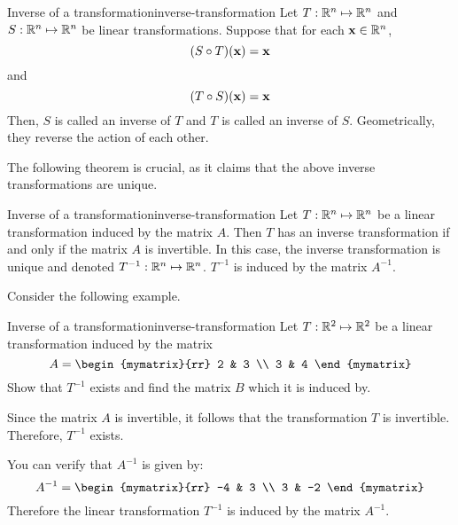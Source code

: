 \begin{definition}{Inverse of a transformation}{inverse-transformation}
Let $T: \mathbb{R}^n \mapsto \mathbb{R}^n$ and $S:\mathbb{R}^n \mapsto \mathbb{R}^n$ be linear transformations. Suppose that for each $\mbox{\bf x} \in \mathbb{R}^n$, 
\[
(S \circ T)(\mbox{\bf x}) = \mbox{\bf x}
\]
and 
\[
(T \circ S)(\mbox{\bf x}) = \mbox{\bf x}
\]
Then, $S$ is called an inverse of $T$  and $T$ is called an inverse of $S$. Geometrically, they reverse the action of each other. 
\end{definition}

The following theorem is crucial, as it claims that the above inverse transformations are unique. 

\begin{theorem}{Inverse of a transformation}{inverse-transformation}
Let $T:\mathbb{R}^n \mapsto \mathbb{R}^n$ be a linear transformation induced by the matrix $A$. Then $T$ has an inverse transformation if and only if the matrix $A$ is invertible. In this case, the inverse transformation is unique and denoted $T^{-1}: \mathbb{R}^n \mapsto \mathbb{R}^n$. $T^{-1}$ is induced by the matrix $A^{-1}$. 
\end{theorem}

Consider the following example. 

\begin{example}{Inverse of a transformation}{inverse-transformation}
Let $T: \mathbb{R}^2 \mapsto \mathbb{R}^2$ be a linear transformation induced by the matrix 
\[
A = 
\begin{mymatrix}{rr}
2 & 3 \\
3 & 4
\end{mymatrix}
\]
Show that $T^{-1}$ exists and find the matrix $B$ which it is induced by. 
\end{example}

\begin{solution}
Since the matrix $A$ is invertible, it follows that the transformation $T$ is invertible. Therefore, $T^{-1}$ exists. 

You can verify that $A^{-1}$ is given by:
\[
A^{-1}
=
\begin{mymatrix}{rr}
-4 & 3 \\
3 & -2
\end{mymatrix}
\]
Therefore the linear transformation $T^{-1}$ is induced by the matrix $A^{-1}$. 
\end{solution}
